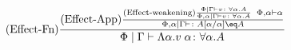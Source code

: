 \documentclass{report}
\begin{document}
 
\begin{equation}
    \treerule{Effect-Fn}{
        \treerule{Effect-App}{
            \treerule{Effect-weakening}{
                \gpetyperelation{v}{\all{\a}{A}}
            }{
                \etyperelation{\P,\a}{\G}{v}{\all{\a}{A}}
            }
        \s\s
            \wellformed{\P,\a}{\a}
        }{
            \etyperelation{
                \P,\a
                }{
                    \G
                }{
               }{A\ssub{\a}{\a}\eq A
            }
            
        }
    }{
        \gpetyperelation{\elam{\a}{\eapp{v}{\a}}}{\all{\a}{A}}
    }
\end{equation}
\end{document}
